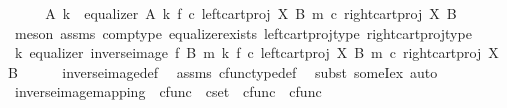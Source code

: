 \begin{isabellebody}
%
\isadelimproof
%
\endisadelimproof
%
\isatagproof
{}\isamarkupfalse%
\ {\isacharminus}{\kern0pt}\isanewline
\ \ \isamarkupfalse%
\ A\ k\ \ {\isachardoublequoteopen}equalizer\ A\ k\ {\isacharparenleft}{\kern0pt}f\ {\isasymcirc}\isactrlsub c\ left{\isacharunderscore}{\kern0pt}cart{\isacharunderscore}{\kern0pt}proj\ X\ B{\isacharparenright}{\kern0pt}\ {\isacharparenleft}{\kern0pt}m\ {\isasymcirc}\isactrlsub c\ right{\isacharunderscore}{\kern0pt}cart{\isacharunderscore}{\kern0pt}proj\ X\ B{\isacharparenright}{\kern0pt}{\isachardoublequoteclose}\isanewline
\ \ \ \ \isamarkupfalse%
\ {\isacharparenleft}{\kern0pt}meson\ assms{\isacharparenleft}{\kern0pt}{}{\isacharcomma}{\kern0pt}{}{\isacharparenright}{\kern0pt}\ comp{\isacharunderscore}{\kern0pt}type\ equalizer{\isacharunderscore}{\kern0pt}exists\ left{\isacharunderscore}{\kern0pt}cart{\isacharunderscore}{\kern0pt}proj{\isacharunderscore}{\kern0pt}type\ right{\isacharunderscore}{\kern0pt}cart{\isacharunderscore}{\kern0pt}proj{\isacharunderscore}{\kern0pt}type{\isacharparenright}{\kern0pt}\isanewline
\ \ \isamarkupfalse%
\ \isamarkupfalse%
\ {\isachardoublequoteopen}{\isasymexists}k{\isachardot}{\kern0pt}\ equalizer\ {\isacharparenleft}{\kern0pt}inverse{\isacharunderscore}{\kern0pt}image\ f\ B\ m{\isacharparenright}{\kern0pt}\ k\ {\isacharparenleft}{\kern0pt}f\ {\isasymcirc}\isactrlsub c\ left{\isacharunderscore}{\kern0pt}cart{\isacharunderscore}{\kern0pt}proj\ X\ B{\isacharparenright}{\kern0pt}\ {\isacharparenleft}{\kern0pt}m\ {\isasymcirc}\isactrlsub c\ right{\isacharunderscore}{\kern0pt}cart{\isacharunderscore}{\kern0pt}proj\ X\ B{\isacharparenright}{\kern0pt}{\isachardoublequoteclose}\isanewline
\ \ \ \ \isamarkupfalse%
\ inverse{\isacharunderscore}{\kern0pt}image{\isacharunderscore}{\kern0pt}def\ \isamarkupfalse%
\ assms\ cfunc{\isacharunderscore}{\kern0pt}type{\isacharunderscore}{\kern0pt}def\ \isamarkupfalse%
\ {\isacharparenleft}{\kern0pt}subst\ someI{}{\isacharunderscore}{\kern0pt}ex{\isacharcomma}{\kern0pt}\ auto{\isacharparenright}{\kern0pt}\isanewline
{}\isamarkupfalse%
%
\endisatagproof
{\isafoldproof}%
%
\isadelimproof
\isanewline
%
\endisadelimproof
\isanewline
{}\isamarkupfalse%
\ inverse{\isacharunderscore}{\kern0pt}image{\isacharunderscore}{\kern0pt}mapping\ {\isacharcolon}{\kern0pt}{\isacharcolon}{\kern0pt}\ {\isachardoublequoteopen}cfunc\ {\isasymRightarrow}\ cset\ {\isasymRightarrow}\ cfunc\ {\isasymRightarrow}\ cfunc{\isachardoublequoteclose}\ \ \isanewline

\end{isabellebody}

